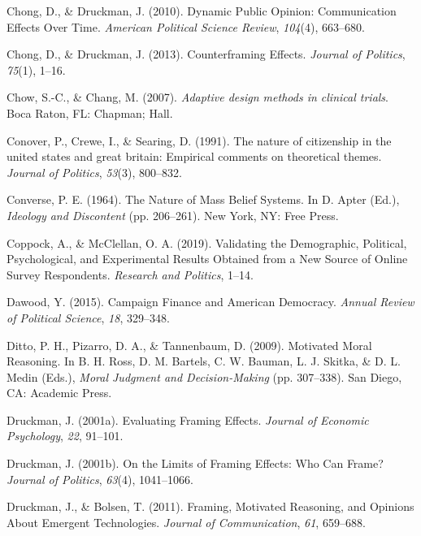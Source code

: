 \documentclass[12pt,econ]{sources/authesis}
\begin{document}
\leavevmode\hypertarget{ref-chong_dynamic_2010}{}%
Chong, D., \& Druckman, J. (2010). Dynamic Public Opinion: Communication Effects Over Time. \emph{American Political Science Review}, \emph{104}(4), 663--680.

\leavevmode\hypertarget{ref-chong_counterframing_2013}{}%
Chong, D., \& Druckman, J. (2013). Counterframing Effects. \emph{Journal of Politics}, \emph{75}(1), 1--16.

\leavevmode\hypertarget{ref-chow_2007_adaptive}{}%
Chow, S.-C., \& Chang, M. (2007). \emph{Adaptive design methods in clinical trials}. Boca Raton, FL: Chapman; Hall.

\leavevmode\hypertarget{ref-conover_1991_nature}{}%
Conover, P., Crewe, I., \& Searing, D. (1991). The nature of citizenship in the united states and great britain: Empirical comments on theoretical themes. \emph{Journal of Politics}, \emph{53}(3), 800--832.

\leavevmode\hypertarget{ref-converse_nature_1964}{}%
Converse, P. E. (1964). The Nature of Mass Belief Systems. In D. Apter (Ed.), \emph{Ideology and Discontent} (pp. 206--261). New York, NY: Free Press.

\leavevmode\hypertarget{ref-coppock_2019_validating}{}%
Coppock, A., \& McClellan, O. A. (2019). Validating the Demographic, Political, Psychological, and Experimental Results Obtained from a New Source of Online Survey Respondents. \emph{Research and Politics}, 1--14.

\leavevmode\hypertarget{ref-dawood_campaign_2015}{}%
Dawood, Y. (2015). Campaign Finance and American Democracy. \emph{Annual Review of Political Science}, \emph{18}, 329--348.

\leavevmode\hypertarget{ref-ditto_motivated_2009}{}%
Ditto, P. H., Pizarro, D. A., \& Tannenbaum, D. (2009). Motivated Moral Reasoning. In B. H. Ross, D. M. Bartels, C. W. Bauman, L. J. Skitka, \& D. L. Medin (Eds.), \emph{Moral Judgment and Decision-Making} (pp. 307--338). San Diego, CA: Academic Press.

\leavevmode\hypertarget{ref-druckman_evaluating_2001}{}%
Druckman, J. (2001a). Evaluating Framing Effects. \emph{Journal of Economic Psychology}, \emph{22}, 91--101.

\leavevmode\hypertarget{ref-druckman_limits_2001}{}%
Druckman, J. (2001b). On the Limits of Framing Effects: Who Can Frame? \emph{Journal of Politics}, \emph{63}(4), 1041--1066.

\leavevmode\hypertarget{ref-druckman_framing_2011}{}%
Druckman, J., \& Bolsen, T. (2011). Framing, Motivated Reasoning, and Opinions About Emergent Technologies. \emph{Journal of Communication}, \emph{61}, 659--688.
\end{document}
